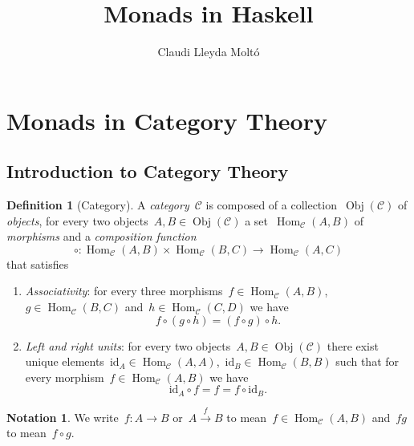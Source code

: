 \documentclass[a4paper]{article}
\title{Monads in Haskell}
\author{Claudi Lleyda Moltó}
\date{}
\theoremstyle{plain}
\theoremstyle{definition}
\newtheorem{definition}[theorem]{Definition}
\newtheorem{notation}[theorem]{Notation}
\DeclareMathOperator{\Obj}{Obj}
\DeclareMathOperator{\Hom}{Hom}
\newcommand{\id}{\mathrm{id}}
\newcommand{\cat}[1]{\mathcal{#1}}
\begin{document}
\maketitle
\tableofcontents
\clearpage
\section{Monads in Category Theory}
\subsection{Introduction to Category Theory}

\begin{definition}[Category]
    \label{def:category}
    A \emph{category}~\(\cat{C}\) is composed of a collection~\(\Obj(\cat{C})\)
    of \emph{objects}, for every two objects~\(A,B\in\Obj(\cat{C})\) a
    set~\(\Hom_{\cat{C}}(A,B)\) of \emph{morphisms} and a \emph{composition
    function}
    \[
        \circ:\Hom_{\cat{C}}(A,B)\times\Hom_{\cat{C}}(B,C) \longrightarrow
        \Hom_{\cat{C}}(A,C)
    \]
    that satisfies
    \begin{enumerate}
        \item \emph{Associativity}: for every three
            morphisms~\(f\in\Hom_{\cat{C}}(A,B)\),~\(g\in\Hom_{\cat{C}}(B,C)\)
            and~\(h\in\Hom_{\cat{C}}(C,D)\)
            we have
            \[
                f \circ (g \circ h) = (f \circ g) \circ h.
            \]
        \item \emph{Left and right units}: for every two
            objects~\(A,B\in\Obj(\cat{C})\) there exist unique
            elements~\(\id_{A}\in\Hom_{\cat{C}}(A,A)\),~\(\id_{B}\in\Hom_{\cat{C}}(B,B)\)
            such that for every morphism~\(f\in\Hom_{\cat{C}}(A,B)\) we have
            \[
                \id_{A} \circ f = f = f \circ \id_{B}.
            \]
    \end{enumerate}
\end{definition}

\begin{notation}
    We write~\(f:A\longrightarrow B\) or~\(A\overset{f}{\longrightarrow}B\) to
    mean~\(f\in\Hom_{\cat{C}}(A,B)\) and~\(fg\) to mean~\(f\circ g\).
\end{notation}
\end{document}
